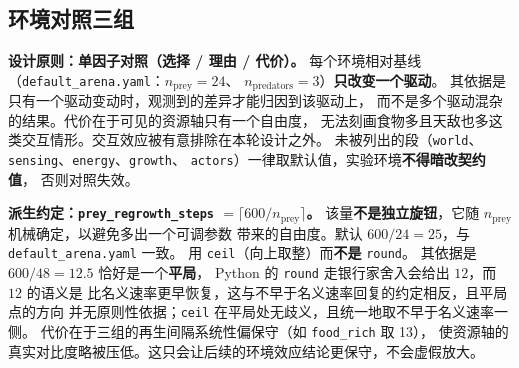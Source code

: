 \subsection{环境对照三组}\label{sec:exp-env-groups}

\textbf{设计原则：单因子对照（选择 / 理由 / 代价）。}
每个环境相对基线（\texttt{default\_arena.yaml}：$n_{\text{prey}}=24$、
$n_{\text{predators}}=3$）\textbf{只改变一个驱动}。
其依据是只有一个驱动变动时，观测到的差异才能归因到该驱动上，
而不是多个驱动混杂的结果。代价在于可见的资源轴只有一个自由度，
无法刻画食物多且天敌也多这类交互情形。交互效应被有意排除在本轮设计之外。
未被列出的段（\texttt{world}、\texttt{sensing}、\texttt{energy}、\texttt{growth}、
\texttt{actors}）一律取默认值，实验环境\textbf{不得暗改契约值}，
否则对照失效。

\begin{table}[H]
  \centering
  \caption{环境对照三组与基线。取值落 \texttt{configs/experiment\_environments.yaml}
  （值冲突以 \texttt{configs/} 为准），依据与状态落 \texttt{docs/参数总表.json}。
  取值属\textbf{设计选择}，无文献实测依据。}
  \label{tab:env-groups}
  \footnotesize
\setlength{\tabcolsep}{3pt}
\end{table}

\textbf{派生约定：\texttt{prey\_regrowth\_steps} $=\lceil 600/n_{\text{prey}}\rceil$。}
该量\textbf{不是独立旋钮}，它随 $n_{\text{prey}}$ 机械确定，以避免多出一个可调参数
带来的自由度。默认 $600/24=25$，与 \texttt{default\_arena.yaml} 一致。
用 \texttt{ceil}（向上取整）而\textbf{不是} \texttt{round}。
其依据是$600/48=12.5$ 恰好是一个\textbf{平局}，
Python 的 \texttt{round} 走银行家舍入会给出 $12$，而 $12$ 的语义是
比名义速率更早恢复，这与不早于名义速率回复的约定相反，且平局点的方向
并无原则性依据；\texttt{ceil} 在平局处无歧义，且统一地取不早于名义速率一侧。
代价在于三组的再生间隔系统性偏保守（如 \texttt{food\_rich} 取 13），
使资源轴的真实对比度略被压低。这只会让后续的环境效应结论更保守，不会虚假放大。

